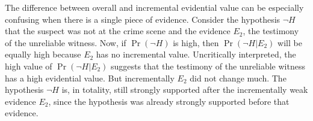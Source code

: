 \documentclass[10pt]{article}
\begin{document}
The difference between overall and incremental evidential value can be especially confusing when there is a single piece of evidence. %
Consider the hypothesis $\neg H$ that the suspect was not at the crime scene and the evidence $E_2$, the testimony of the unreliable witness. Now, 
if $\Pr(\neg H)$ is high, then $\Pr(\neg H | E_2)$ will be equally high because
$E_2$ has no incremental value. 
Uncritically interpreted, the high value of $\Pr(\neg H | E_2)$ suggests that the testimony of the unreliable witness has a high evidential value. But incrementally $E_2$ did not change much. The hypothesis $\neg H$ is, in totality, still strongly supported after the incrementally weak evidence $E_2$, since the hypothesis was already strongly supported before that evidence. 
\end{document}
